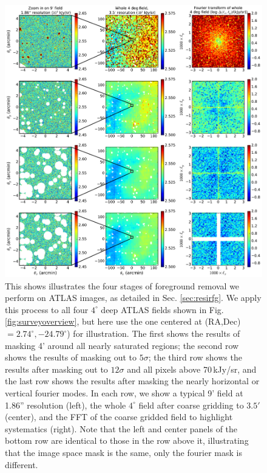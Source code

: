 \documentclass{emulateapj}
\begin{document}
\begin{figure}[h]
\centering
\includegraphics[width=7in]{images/big_foreground_masking_study_2_magoffset=20_56+0_274.pdf}
\caption{This shows illustrates the four stages of foreground removal we perform on ATLAS images, as detailed in Sec. \ref{sec:resirfg}. We apply this process to all four $4^\circ$ deep ATLAS fields shown in Fig. \ref{fig:surveyoverview}, but here use the one centered at (RA,Dec)$=2.74^\circ, -24.79^\circ$) for illustration. The first shows the results of masking 4' around all nearly saturated regions; the second row shows the results of masking out to $5\sigma$; the third row shows the results after masking out to $12\sigma$ and all pixels above 70\,kJy/sr, and the last row shows the results after masking the nearly horizontal or vertical fourier modes. In each row, we show a typical 9' field at 1.86'' resolution (left), the whole $4^\circ$ field after coarse gridding to $3.5'$ (center), and the FFT of the coarse gridded field to highlight systematics (right). Note that the left and center panels of the bottom row are identical to those in the row above it, illustrating that the image space mask is the same, only the fourier mask is different.}
\label{fig:bigfgmaskingstudy}
\end{figure}
\end{document}
